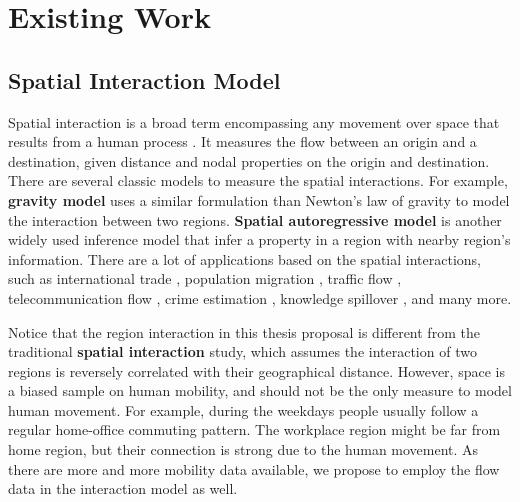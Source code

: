 \section{Existing Work}
\label{sec:ew}



\subsection{Spatial Interaction Model}


Spatial interaction is a broad term encompassing any movement over space that results from a human process \cite{haynes1984gravity,rodrigue2013geography}. It measures the flow between an origin and a destination, given distance and nodal properties on the origin and destination.  There are several classic models to measure the spatial interactions. For example, \textbf{gravity model} \cite{matyas1997proper} uses a similar formulation than Newton's law of gravity to model the interaction between two regions.
\textbf{Spatial autoregressive model} \cite{anselin1980estimation} is another widely used inference model that infer a property in a region with nearby region's information. There are a lot of  applications  based on the spatial interactions, such as international trade \cite{carrere2006revisiting, egger2003proper, martinez2003augmented}, population migration \cite{hanski1994metapopulation, karemera2000gravity, lewer2008gravity}, traffic flow \cite{jung2008gravity, roughan2002experience, khadaroo2008role}, telecommunication flow \cite{krings2009urban, fischer1994artificial, black1995spatial}, crime estimation \cite{anselin2000spatial, kakamu2008spatial, browning2004paradox}, knowledge spillover \cite{lesage2007knowledge, fischer2006geography}, and many more.



Notice that the region interaction in this thesis proposal is different from the traditional \textbf{spatial interaction} study, which assumes the interaction of two regions is reversely correlated with their geographical distance. However, space is a biased sample on human mobility, and should not be the only measure to model human movement. For example, during the weekdays people usually follow a regular home-office commuting pattern. The workplace region might be far from home region, but their connection is strong due to the human movement. As there are more and more mobility data available, we propose to employ the flow data in the interaction model as well.







